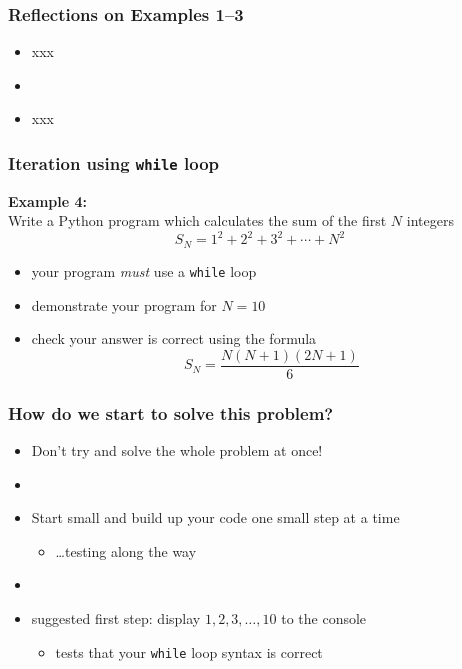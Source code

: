 \documentclass[english,14pt]{beamer}
\begin{document}
\begin{frame}[fragile]

\frametitle{Reflections on Examples 1--3}

\begin{itemize}
	\item xxx
	\item[]
	\item xxx
\end{itemize}
\end{frame}


\begin{frame}[fragile]

\frametitle{Iteration using \texttt{while} loop}

\textbf{Example 4:}\\
\vspace*{5mm}
Write a Python program which calculates the sum of the first $N$ integers
\[
S_N = 1^2 + 2^2 + 3^2 + \cdots + N^2
\]

\begin{itemize}
	\item your program \emph{must} use a \texttt{while} loop
	\item demonstrate your program for $N=10$
	\item check your answer is correct using the formula
	\[
		S_N = \frac{N(N+1)(2N+1)}{6}
	\]

\end{itemize}

\end{frame}


\begin{frame}[fragile]

\frametitle{How do we start to solve this problem?}

\begin{itemize}
	\item Don't try and solve the whole problem at once!
	\item[]
	\item Start small and build up your code one small step at a time
	\begin{itemize}
		\item \ldots testing along the way
	\end{itemize}
	\item[]
	\item suggested first step: display $1,2,3,\ldots,10$ to the console
	\begin{itemize}
		\item tests that your \texttt{while} loop syntax is correct
	\end{itemize}
\end{itemize}

\end{frame}
\end{document}
